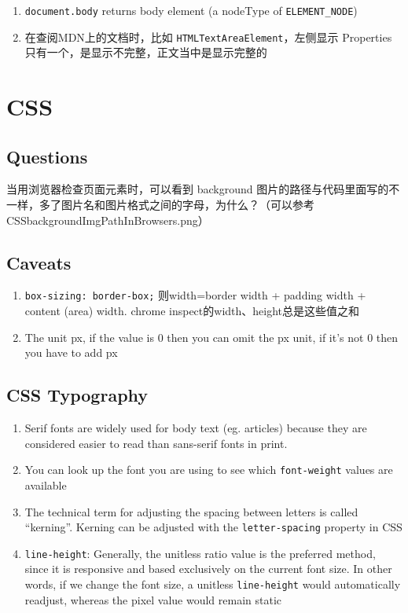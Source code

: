 \documentclass[a4paper, 12pt]{article}
\begin{document}
\begin{enumerate}
\item \verb|document.body| returns body element (a nodeType of \verb|ELEMENT_NODE|)

\item 在查阅MDN上的文档时，比如 \verb|HTMLTextAreaElement|，左侧显示 Properties 只有一个，是显示不完整，正文当中是显示完整的

\end{enumerate}


\section{CSS}

\subsection{Questions}
当用浏览器检查页面元素时，可以看到 background 图片的路径与代码里面写的不一样，多了图片名和图片格式之间的字母，为什么？（可以参考 CSSbackgroundImgPathInBrowsers.png）

\subsection{Caveats}
\begin{enumerate}

\item {\color{red}\verb|box-sizing: border-box;|} 则width=border width + padding width + content (area) width. chrome inspect的width、height总是这些值之和

\item The unit px, if the value is 0 then you can omit the px unit, if it's not 0 then you have to add px

\end{enumerate}


\subsection{CSS Typography}
\begin{enumerate}

\item Serif fonts are widely used for body text (eg. articles) because they are considered easier to read than sans-serif fonts in print.

\item You can look up the font you are using to see which \verb|font-weight| values are available

\item The technical term for adjusting the spacing between letters is called ``kerning''. Kerning can be adjusted with the \verb|letter-spacing| property in CSS

\item \verb|line-height|: Generally, the unitless ratio value is the preferred method, since it is responsive and based exclusively on the current font size. In other words, if we change the font size, a unitless \verb|line-height| would automatically readjust, whereas the pixel value would remain static

\end{enumerate}
\end{document}
